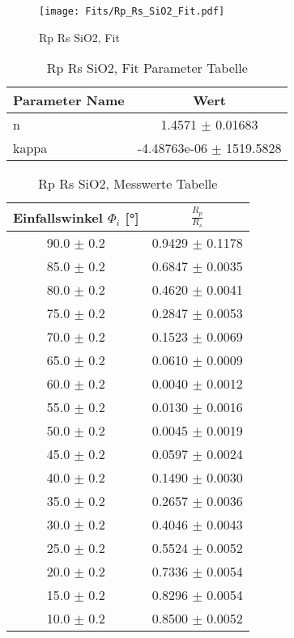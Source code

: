 \begin{figure}[ht] 
 	\centering 
 	\texttt{[image: Fits/Rp\_Rs\_SiO2\_Fit.pdf]} 
	\caption{Rp Rs SiO2, Fit} 
 	\label{fig:Rp Rs SiO2, Fit} 
\end{figure}
 
\begin{table}[ht] 
	\centering 
	\caption{Rp Rs SiO2, Fit Parameter Tabelle} 
	\label{tab: Rp Rs SiO2, Fit Parameter Tabelle}
	\begin{tabular}{|l|c|}
		\hline
		Parameter Name	&	Wert \\ \hline
		n	&	 1.4571 $\pm$  0.01683\\ \hline
		kappa	&	-4.48763e-06 $\pm$  1519.5828\\ \hline
	\end{tabular} 
\end{table}
 
\begin{table}[ht] 
	\centering 
	\caption{Rp Rs SiO2, Messwerte Tabelle} 
	\label{tab: Rp Rs SiO2, Messwerte Tabelle}
	\begin{tabular}{|c|c|}
		\hline
		Einfallswinkel $\Phi_i$ [°] 	&	 $\frac{R_p}{R_s}$\\ \hline
		90.0 $\pm$ 0.2 	&	 0.9429 $\pm$ 0.1178 \\ \hline
		85.0 $\pm$ 0.2 	&	 0.6847 $\pm$ 0.0035 \\ \hline
		80.0 $\pm$ 0.2 	&	 0.4620 $\pm$ 0.0041 \\ \hline
		75.0 $\pm$ 0.2 	&	 0.2847 $\pm$ 0.0053 \\ \hline
		70.0 $\pm$ 0.2 	&	 0.1523 $\pm$ 0.0069 \\ \hline
		65.0 $\pm$ 0.2 	&	 0.0610 $\pm$ 0.0009 \\ \hline
		60.0 $\pm$ 0.2 	&	 0.0040 $\pm$ 0.0012 \\ \hline
		55.0 $\pm$ 0.2 	&	 0.0130 $\pm$ 0.0016 \\ \hline
		50.0 $\pm$ 0.2 	&	 0.0045 $\pm$ 0.0019 \\ \hline
		45.0 $\pm$ 0.2 	&	 0.0597 $\pm$ 0.0024 \\ \hline
		40.0 $\pm$ 0.2 	&	 0.1490 $\pm$ 0.0030 \\ \hline
		35.0 $\pm$ 0.2 	&	 0.2657 $\pm$ 0.0036 \\ \hline
		30.0 $\pm$ 0.2 	&	 0.4046 $\pm$ 0.0043 \\ \hline
		25.0 $\pm$ 0.2 	&	 0.5524 $\pm$ 0.0052 \\ \hline
		20.0 $\pm$ 0.2 	&	 0.7336 $\pm$ 0.0054 \\ \hline
		15.0 $\pm$ 0.2 	&	 0.8296 $\pm$ 0.0054 \\ \hline
		10.0 $\pm$ 0.2 	&	 0.8500 $\pm$ 0.0052 \\ \hline
	\end{tabular} 
\end{table}
 

